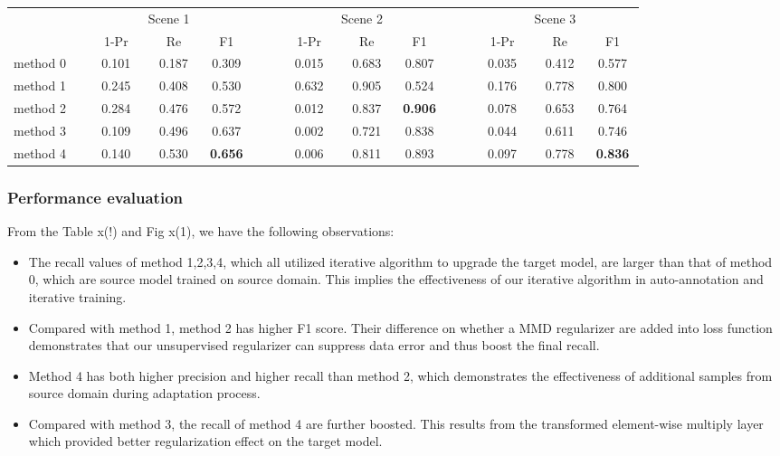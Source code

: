 \documentclass[runningheads]{llncs}
\begin{document}
\begin{table}
\centering
\begin{tabular}{l  c c c  c  c c c  c  c c c}
  \hline
    &   \multicolumn{3}{c}{Scene 1}   & & \multicolumn{3}{c}{Scene 2} & &  \multicolumn{3}{c}{Scene 3}   \\
   \cline{2-4} \cline{6-8} \cline{10-12}
    & ~~1-Pr~~ & ~~Re~~ & ~~F1~~ & & ~~1-Pr~~ & ~~Re~~ & ~~F1~~ & & ~~1-Pr~~ & ~~Re~~ & ~~F1~~\\
  \hline
  method 0~~ & 0.101 & 0.187 & 0.309 & ~~ & 0.015 & 0.683 & 0.807 & ~~ & 0.035 & 0.412 & 0.577 \\
  method 1~~ & 0.245 & 0.408 & 0.530 & ~~ & 0.632 & 0.905 & 0.524 & ~~ & 0.176 & 0.778 & 0.800 \\
  method 2~~ & 0.284 & 0.476 & 0.572 & ~~ & 0.012 & 0.837 & {\bf 0.906} & ~~ & 0.078 & 0.653 & 0.764 \\
  method 3~~ & 0.109 & 0.496 & 0.637 & ~~ & 0.002 & 0.721 & 0.838 & ~~ & 0.044 & 0.611 & 0.746 \\
  method 4~~ & 0.140 & 0.530 & {\bf 0.656} & ~~ & 0.006 & 0.811 & 0.893 & ~~ & 0.097 & 0.778 & {\bf 0.836} \\
  \hline
\end{tabular}
\end{table}

\subsubsection{Performance evaluation}
From the Table x(!) and Fig x(1), we have the following observations:
\begin{itemize}
  \item The recall values of method 1,2,3,4, which all utilized iterative algorithm to upgrade the target model, are larger than that of method 0, which are source model trained on source domain. This implies the effectiveness of our iterative algorithm in auto-annotation and iterative training.
  \item Compared with method 1, method 2 has higher F1 score. Their difference on whether a MMD regularizer are added into loss function demonstrates that our unsupervised regularizer can suppress data error and thus boost the final recall.
  \item Method 4 has both higher precision and higher recall than method 2, which demonstrates the effectiveness of additional samples from source domain during adaptation process.
  \item Compared with method 3, the recall of method 4 are further boosted. This results from the transformed element-wise multiply layer which provided better regularization effect on the target model.
\end{itemize}
\end{document}
